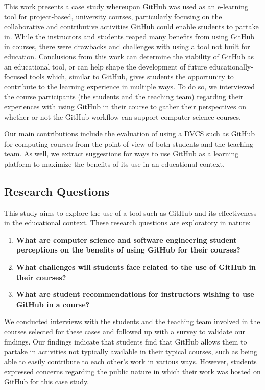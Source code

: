 This work presents a case study whereupon GitHub was used as an e-learning tool for project-based, university courses, particularly focusing on the collaborative and contributive activities GitHub could enable students to partake in. While the instructors and students reaped many benefits from using GitHub in courses, there were drawbacks and challenges with using a tool not built for education. Conclusions from this work can determine the viability of GitHub as an educational tool, or can help shape the development of future educationally-focused tools which, similar to GitHub, gives students the opportunity to contribute to the learning experience in multiple ways. To do so, we interviewed the course participants (the students and the teaching team) regarding their experiences with using GitHub in their course to gather their perspectives on whether or not the GitHub workflow can support computer science courses.

Our main contributions include the evaluation of using a DVCS such as GitHub for computing courses from the point of view of both students and the teaching team. As well, we extract suggestions for ways to use GitHub as a learning platform to maximize the benefits of its use in an educational context.

\subsection{Research Questions}
This study aims to explore the use of a tool such as GitHub and its effectiveness in the educational context. These research questions are exploratory in nature: 

\begin{enumerate}
\item \textbf{What are computer science and software engineering student perceptions on the benefits of using GitHub for their courses?}
\item \textbf{What challenges will students face related to the use of GitHub in their courses?}
\item \textbf{What are student recommendations for instructors wishing to use GitHub in a course?}
\end{enumerate}



We conducted interviews with the students and the teaching team involved in the courses selected for these cases and followed up with a survey to validate our findings. Our findings indicate that students find that GitHub allows them to partake in activities not typically available in their typical courses, such as being able to easily contribute to each other's work in various ways. However, students expressed concerns regarding the public nature in which their work was hosted on GitHub for this case study.


